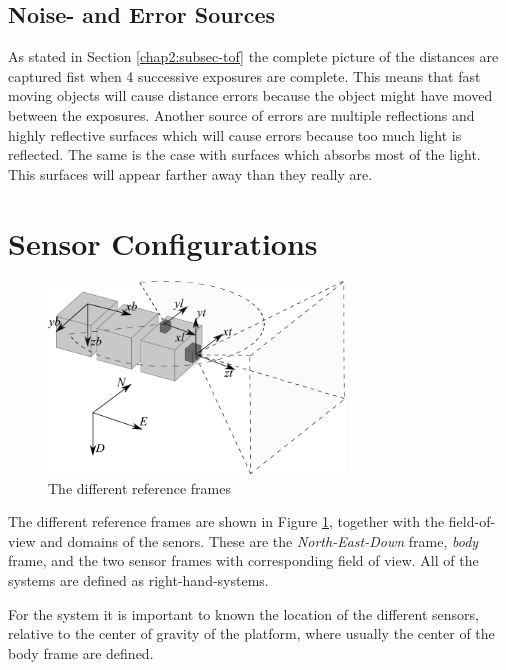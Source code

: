 \subsection{Noise- and Error Sources}
As stated in Section \ref{chap2:subsec-tof} the complete picture of the distances are
captured fist when 4 successive exposures are complete. This means that fast moving
objects will cause distance errors because the object might have moved between the
exposures. Another source of errors are multiple reflections and highly reflective
surfaces which will cause errors because too much light is reflected. The same is the case
with surfaces which absorbs most of the light. This surfaces will appear farther away than
they really are. 


\section{Sensor Configurations}
\label{chap3:sec-sensorconfig}
\begin{figure}[htbp]
    \centering
    \includegraphics[width=0.7\textwidth]{pics/sensor-config}
    \caption{The different reference frames}
    \label{chap3:fig-sensor-frames}
\end{figure}
The different reference frames are shown in Figure \ref{chap3:fig-sensor-frames}, together
with the field-of-view and domains of the senors. These are the
\emph{North-East-Down} frame, \emph{body} frame, and the two sensor frames with
corresponding field of view. All of the systems are defined as right-hand-systems. 

For the system it is important to known the location of the different sensors, relative to
the center of gravity of the platform, where usually the center of the body frame are
defined. 


